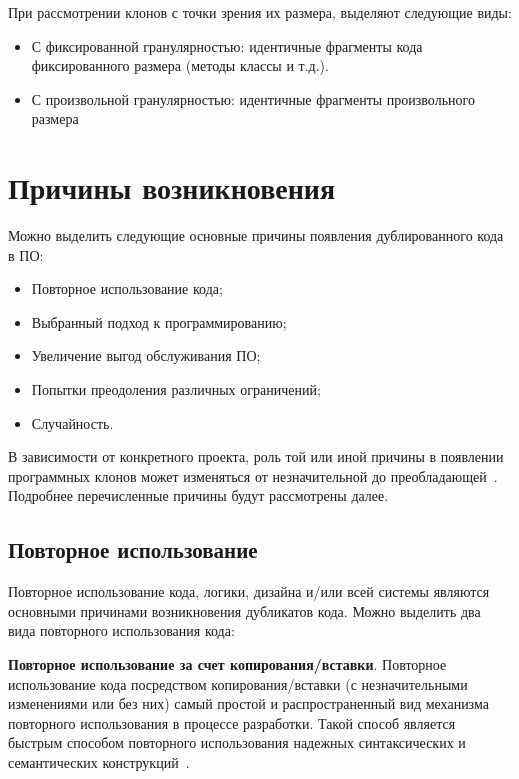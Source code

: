 При рассмотрении клонов с точки зрения их размера, выделяют следующие виды:
\begin{itemize}
\setlength\itemsep{0mm}
\item С фиксированной гранулярностью: идентичные фрагменты кода фиксированного размера (методы классы и т.д.).
\item С произвольной гранулярностью: идентичные фрагменты произвольного размера
\end{itemize}


\section{Причины возникновения}

Можно выделить следующие основные причины появления дублированного кода в ПО:
\begin{itemize}
\setlength\itemsep{0mm}
\item Повторное использование кода;
\item Выбранный подход к программированию;
\item Увеличение выгод обслуживания ПО;
\item Попытки преодоления различных ограничений;
\item Случайность.
\end{itemize}

В зависимости от конкретного проекта, роль той или иной причины в появлении программных клонов может изменяться от незначительной до преобладающей~\cite{akhinitsykson}. Подробнее перечисленные причины будут рассмотрены далее.

\subsection{Повторное использование}

Повторное использование кода, логики, дизайна и/или всей системы являются основными причинами возникновения дубликатов кода. Можно выделить два вида повторного использования кода:

\textbf{Повторное использование за счет копирования/вставки}. Повторное использование кода посредством копирования/вставки (с незначительными изменениями или без них) самый простой и распространенный вид механизма повторного использования в процессе разработки. Такой способ является быстрым способом повторного использования надежных синтаксических и семантических конструкций~\cite{copypaste}.

